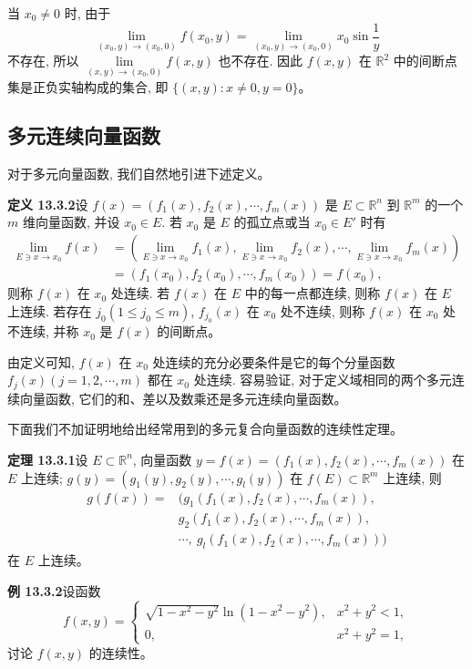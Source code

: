 \documentclass[UTF8,12pt,a4paper,fontset=fandol]{ctexart}
\begin{document}
当 $x_0\ne0$ 时, 由于
\[
  \lim_{(x_0,y)\to(x_0,0)}f(x_0,y)
  =\lim_{(x_0,y)\to(x_0,0)}x_0\sin\frac1y
\]
不存在, 所以 $\lim\limits_{(x,y)\to(x_0,0)}f(x,y)$ 也不存在. 因此 $f(x,y)$ 在 $\mathbb R^2$ 中的间断点集是正负实轴构成的集合, 即 $\{(x,y):x\ne0,y=0\}$。

\subsection{多元连续向量函数}

对于多元向量函数, 我们自然地引进下述定义。

\noindent\textbf{定义 13.3.2}\quad 设 $f(x)=(f_1(x),f_2(x),\cdots,f_m(x))$ 是 $E\subset\mathbb R^n$ 到 $\mathbb R^m$ 的一个 $m$ 维向量函数, 并设 $x_0\in E$. 若 $x_0$ 是 $E$ 的孤立点或当 $x_0\in E'$ 时有
\[
\begin{aligned}
  \lim_{E\ni x\to x_0}f(x)
  &=
  \left(\lim_{E\ni x\to x_0}f_1(x),
  \lim_{E\ni x\to x_0}f_2(x),
  \cdots,\lim_{E\ni x\to x_0}f_m(x)\right)\\
  &=(f_1(x_0),f_2(x_0),\cdots,f_m(x_0))=f(x_0),
\end{aligned}
\]
则称 $f(x)$ 在 $x_0$ 处连续. 若 $f(x)$ 在 $E$ 中的每一点都连续, 则称 $f(x)$ 在 $E$ 上连续. 若存在 $j_0(1\leqslant j_0\leqslant m)$, $f_{j_0}(x)$ 在 $x_0$ 处不连续, 则称 $f(x)$ 在 $x_0$ 处不连续, 并称 $x_0$ 是 $f(x)$ 的间断点。

由定义可知, $f(x)$ 在 $x_0$ 处连续的充分必要条件是它的每个分量函数 $f_j(x)(j=1,2,\cdots,m)$ 都在 $x_0$ 处连续. 容易验证, 对于定义域相同的两个多元连续向量函数, 它们的和、差以及数乘还是多元连续向量函数。

下面我们不加证明地给出经常用到的多元复合向量函数的连续性定理。

\noindent\textbf{定理 13.3.1}\quad 设 $E\subset\mathbb R^n$, 向量函数 $y=f(x)=(f_1(x),f_2(x),\cdots,f_m(x))$ 在 $E$ 上连续; $g(y)=(g_1(y),g_2(y),\cdots,g_l(y))$ 在 $f(E)\subset\mathbb R^m$ 上连续, 则
\[
\begin{aligned}
  g(f(x))={}&(g_1(f_1(x),f_2(x),\cdots,f_m(x)),\\
  &g_2(f_1(x),f_2(x),\cdots,f_m(x)),\\
  &\cdots,\ g_l(f_1(x),f_2(x),\cdots,f_m(x)))
\end{aligned}
\]
在 $E$ 上连续。

\noindent\textbf{例 13.3.2}\quad 设函数
\[
  f(x,y)=
  \begin{cases}
    \sqrt{1-x^2-y^2}\ln(1-x^2-y^2), & x^2+y^2<1,\\
    0, & x^2+y^2=1,
  \end{cases}
\]
讨论 $f(x,y)$ 的连续性。
\end{document}
